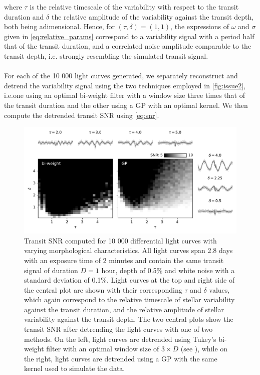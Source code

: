 \documentclass[modern,linenumbers]{aastex631}
\begin{document}
where $\tau$ is the relative timescale of the variability with respect to the transit duration and $\delta$ the relative amplitude of the variability against the transit depth, both being adimensional. Hence, for $(\tau, \delta)=(1, 1)$, the expressions of $\omega$ and $\sigma$ given in \autoref{eq:relative_params} correspond to a variability signal with a period half that of the transit duration, and a correlated noise amplitude comparable to the transit depth, i.e. strongly resembling the simulated transit signal.\\\\
For each of the 10 000 light curves generated, we separately reconstruct and detrend the variability signal using the two techniques employed in \autoref{fig:issue2}, i.e.\;one using an optimal bi-weight filter with a window size three times that of the transit duration \citep{wotan} and the other using a GP with an optimal kernel. We then compute the detrended transit SNR using \autoref{eq:snr}.
\begin{figure}[H]
    \begin{centering}
        \includegraphics[width=\linewidth]{../workflows/cleaning_snr/figures/result.pdf}
        \caption{Transit SNR computed for 10 000 differential light curves with varying morphological characteristics. All light curves span 2.8 days with an exposure time of 2 minutes and contain the same transit signal of  duration $D=1$ hour, depth of 0.5\% and white noise with a standard deviation of 0.1\%. Light curves at the top and right side of the central plot are shown with their corresponding $\tau$ and $\delta$ values, which again correspond to the relative timescale of stellar variability against the transit duration, and the relative amplitude of stellar variability against the transit depth. The two central plots show the transit SNR after detrending the light curves with one of two methods. On the left, light curves are detrended using Tukey's bi-weight filter with an optimal window size of $3\times D$ (see \citealt{wotan}), while on the right, light curves are detrended using a GP with the same kernel used to simulate the data.}
        \label{fig:snr_detrend}
    \end{centering}
\end{figure}
\end{document}
